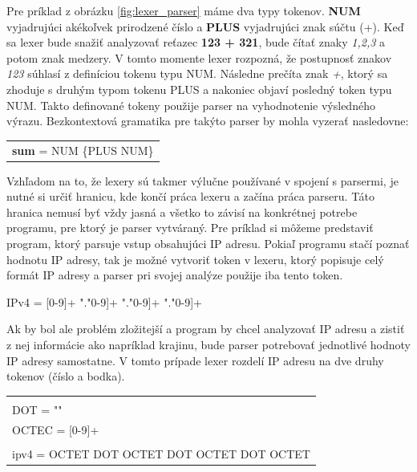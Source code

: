 Pre príklad z obrázku \ref{fig:lexer_parser}  máme dva typy tokenov. \textbf{NUM} vyjadrujúci akékoľvek prirodzené číslo a \textbf{PLUS} vyjadrujúci znak súčtu (+). Keď sa lexer bude snažiť analyzovať reťazec \textbf{123 + 321}, bude čítať znaky \textit{1,2,3} a potom znak medzery. V tomto momente lexer rozpozná, že postupnosť znakov \textit{123} súhlasí z definíciou tokenu typu NUM. Následne prečíta znak \textit{+}, ktorý sa zhoduje s druhým typom tokenu PLUS a nakoniec objaví posledný token typu NUM. Takto definované tokeny použije parser na vyhodnotenie výsledného výrazu. Bezkontextová gramatika pre takýto parser by mohla vyzerať nasledovne:

\begin{center}
\begin{tabular}{p{}}
\textbf{sum} = NUM \{PLUS NUM\}
\end{tabular}
\end{center}

Vzhľadom na to, že lexery sú takmer výlučne používané v spojení s parsermi, je nutné si určiť hranicu, kde končí práca lexeru a začína práca parseru. Táto hranica nemusí byť vždy jasná a všetko to závisí na konkrétnej potrebe programu, pre ktorý je parser vytváraný. Pre príklad si môžeme predstaviť program, ktorý parsuje vstup obsahujúci IP adresu. Pokiaľ programu stačí poznať hodnotu IP adresy, tak je možné vytvoriť token v lexeru, ktorý popisuje celý formát IP adresy a parser pri svojej analýze použije iba tento token. 
\begin{center}
IPv4 = [0-9]+ "."\text{ [}0-9]+ "."\text{ [}0-9]+ "."\text{ [}0-9]+
\end{center}

Ak by bol ale problém zložitejší a program by chcel analyzovať IP adresu a zistiť z nej informácie ako napríklad krajinu, bude parser potrebovať jednotlivé hodnoty IP adresy samostatne. V tomto prípade lexer rozdelí IP adresu na dve druhy tokenov (číslo a bodka).

\begin{center}
\begin{tabular}{p{}}
\color{editorGray}{/* Lexer */}\\
DOT   = "\text{.}"\\
OCTEC = [0-9]+\\
\color{editorGray}{/* Parser */}\\
ipv4  = OCTET DOT OCTET DOT OCTET DOT OCTET
\end{tabular}
\end{center}


